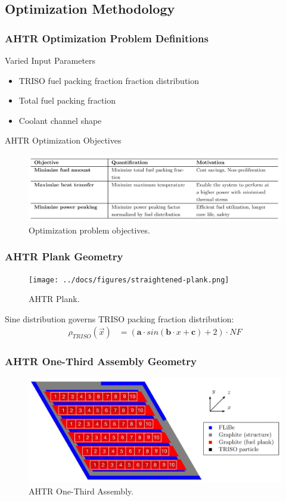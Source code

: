 \subsection{Optimization Methodology}
\begin{frame}
    \frametitle{AHTR Optimization Problem Definitions}
    \begin{block}{Varied Input Parameters}
        \begin{itemize}
            \item TRISO fuel packing fraction fraction distribution 
            \item Total fuel packing fraction 
            \item Coolant channel shape 
        \end{itemize}
    \end{block}
    \begin{block}{AHTR Optimization Objectives}
        \begin{figure}
            \includegraphics[width=0.9\linewidth]{figures/ahtr-opt-obj.png} 
            \caption{Optimization problem objectives.}
        \end{figure}
    \end{block}
\end{frame}

\begin{frame}
    \frametitle{AHTR Plank Geometry}
    \begin{figure}
        \texttt{[image: ../docs/figures/straightened-plank.png]} 
        \caption{AHTR Plank.}
    \end{figure}
    Sine distribution governs TRISO packing fraction distribution: 
    \begin{align}
        \rho_{TRISO}(\vec{x}) &= \left(\textbf{a}\cdot sin(\textbf{b}\cdot x + \textbf{c}) + 2\right) \cdot NF \nonumber
    \end{align}
\end{frame}

\begin{frame}
    \frametitle{AHTR One-Third Assembly Geometry}
    \begin{figure}
        \includegraphics[width=\linewidth]{figures/ahtr-assembly-pres.png} 
        \caption{AHTR One-Third Assembly.}
    \end{figure}
\end{frame}

